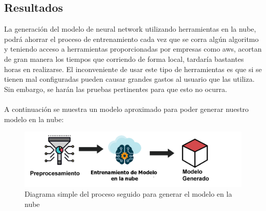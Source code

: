 \documentclass[12pt, a4paper, titlepage]{report}
\begin{document}
	\subsection{Resultados}
	La generación del modelo de neural network utilizando herramientas en la nube, podrá ahorrar el proceso de entrenamiento cada vez que se corra algún algoritmo y teniendo acceso a herramientas proporcionadas por empresas como \acrshort{aws}, acortan de gran manera los tiempos que corriendo de forma local, tardaría bastantes horas en realizarse. El inconveniente de usar este tipo de herramientas es que si se tienen mal configuradas pueden causar grandes gastos al usuario que las utiliza. Sin embargo, se harán las pruebas pertinentes para que esto no ocurra.\\\\
	A continuación se muestra un modelo aproximado para poder generar nuestro modelo en la nube:
	\begin{figure}[H]
	\includegraphics[width=12cm]{./imagenes/Disenio/Iteracion_4/resultado_arquitectura.png}
	\centering 
	\caption{Diagrama simple del proceso seguido para generar el modelo en la nube}
	\end{figure}
	
	\newpage
\end{document}
